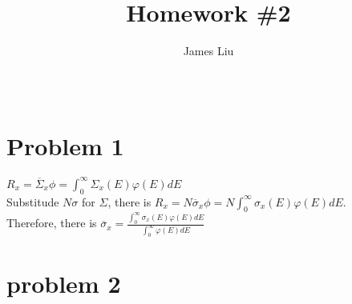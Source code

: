 \documentclass{article}
\title{\textbf{Homework \#2 }}
\author{James Liu}
\date{\ }
\begin{document}
\maketitle
\section*{Problem 1}

\(R_x = \overline{\Sigma}_x\phi =\displaystyle{{\int^\infty_0 \Sigma_x(E)\varphi(E)dE}}\)\\
Substitude \(N\sigma \) for \(\Sigma\), there is \(R_x = N\overline{\sigma}_x \phi=N\displaystyle{{\int^\infty_0 \sigma_x(E)\varphi(E)dE}}\).\\
Therefore, there is \(\overline{\sigma}_x=\displaystyle{\frac{\int^\infty_0 \sigma_x(E)\varphi(E)dE}{\int^\infty_0\varphi(E)dE}}\)
\section*{problem 2}
\end{document}
